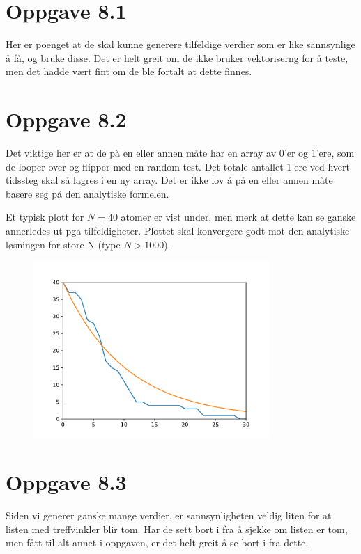 \documentclass[10pt,a4paper]{article}
\begin{document}
\section*{Oppgave 8.1}
Her er poenget at de skal kunne generere tilfeldige verdier som er like sannsynlige å få, og bruke disse. Det er helt greit om de ikke bruker vektoriserng for å teste, men det hadde vært fint om de ble fortalt at dette finnes. 



\newpage
\section*{Oppgave 8.2}
Det viktige her er at de på en eller annen måte har en array av 0'er og 1'ere, som de looper over og flipper med en random test. Det totale antallet 1'ere ved hvert tidssteg skal så lagres i en ny array. Det er ikke lov å på en eller annen måte basere seg på den analytiske formelen.

Et typisk plott for $N = 40$ atomer er vist under, men merk at dette kan se ganske annerledes ut pga tilfeldigheter. Plottet skal konvergere godt mot den analytiske løsningen for store N (type $N>1000$).


\begin{figure}[H]
\centering
\includegraphics[width=0.8\textwidth]{fig_random_decay.pdf}
\end{figure}

\newpage
\section*{Oppgave 8.3}
Siden vi generer ganske mange verdier, er sannsynligheten veldig liten for at listen med treffvinkler blir tom. Har de sett bort i fra å sjekke om listen er tom, men fått til alt annet i oppgaven, er det helt greit å se bort i fra dette.
\end{document}
